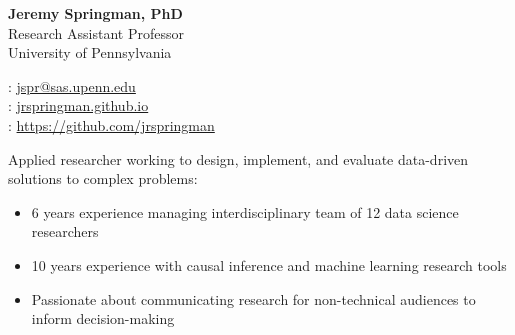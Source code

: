 \documentclass[11pt]{article}
\renewcommand{\today}{\monthname[\the\month] \the\year}
\begin{document}
\thispagestyle{empty}



\begin{multicols}{2}
{\Large {\bf Jeremy Springman, PhD}}\\
Research Assistant Professor\\
University of Pennsylvania\\

\columnbreak
\begin{flushright}

\faEnvelope: \href{mailto:jspr@sas.upenn.edu}{jspr@sas.upenn.edu}\\
\faLaptop: \url{jrspringman.github.io}\\
\faGithub: \url{https://github.com/jrspringman}\\
\end{flushright}
\end{multicols}
\vspace{-10pt}

Applied researcher working to design, implement, and evaluate data-driven solutions to complex problems:
\begin{itemize}[itemsep=0mm, parsep=0pt]
\item 6 years experience managing interdisciplinary team of 12 data science researchers
\item 10 years experience with causal inference and machine learning research tools
\item Passionate about communicating research for non-technical audiences to inform decision-making
\end{itemize}
\end{document}
